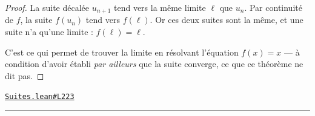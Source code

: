 \documentclass[11pt,a4paper]{article}
\theoremstyle{definition}
\theoremstyle{plain}
\newcommand{\source}[2]{\par\smallskip\noindent\hfill{\footnotesize\href{#1}{\texttt{#2}}}\par\smallskip}
\begin{document}
\begin{proof}
La suite décalée $u_{n+1}$ tend vers la même limite $\ell$ que $u_n$. Par continuité de
$f$, la suite $f(u_n)$ tend vers $f(\ell)$. Or ces deux suites sont la même, et une suite
n'a qu'une limite : $f(\ell) = \ell$.

C'est ce qui permet de trouver la limite en résolvant l'équation $f(x) = x$ — à condition
d'avoir établi \emph{par ailleurs} que la suite converge, ce que ce théorème ne dit pas.
\end{proof}
\source{https://github.com/Commutator-IO/learn-lean/blob/main/cours/02-lycee/03-suites/Suites.lean\#L223}{Suites.lean\#L223}

\vfill
\noindent\rule{0.35\linewidth}{0.4pt}\par
{}
\end{document}
